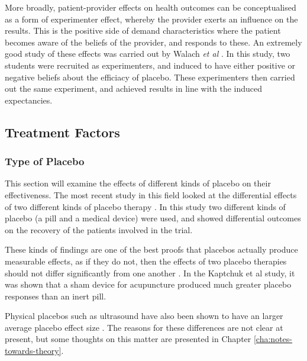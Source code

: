 More broadly, patient-provider effects on health outcomes can be conceptualised as a form of experimenter effect, whereby the provider exerts an influence on the results. This is the positive side of demand characteristics where the patient becomes aware of the beliefs of the provider, and responds to these. An extremely good study of these effects was carried out by Walach \textit{et al} \cite{Walach2002}. In this study, two students were recruited as experimenters, and induced to have either positive or negative beliefs about the efficiacy of placebo. These experimenters then carried out the same experiment, and achieved results in line with the induced expectancies. 


\subsection{Treatment Factors}

\subsubsection{Type of Placebo}
\label{sec:type-placebo}

This section will examine the effects of different kinds of placebo on their effectiveness. The most recent study in this field looked at the differential effects of two different kinds of placebo therapy \cite{Kaptchuk2006}. In this study two different kinds of placebo (a pill and a medical device) were used, and showed differential outcomes on the recovery of the patients involved in the trial. 

These kinds of findings are one of the best proofs  that placebos actually produce measurable effects, as if they do not, then the effects of two placebo therapies should not differ significantly from one another \cite{Kaptchuk2006}. In the Kaptchuk et al study, it was shown that a sham device for acupuncture produced much greater placebo responses than an inert pill. 

Physical placebos such as ultrasound have also been shown to have an larger average placebo effect size \cite{Ernst1995b}.  The reasons for these differences are not clear at present, but some thoughts on this matter are presented in Chapter \ref{cha:notes-towards-theory}. 

